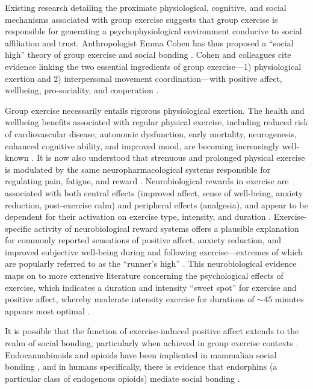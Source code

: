 \begin{CJK}{UTF8}{gbsn}
Existing research detailing the proximate physiological, cognitive, and social mechanisms associated with group exercise suggests that group exercise is responsible for generating a psychophysiological environment conducive to social affiliation and trust.  Anthropologist Emma Cohen has thus proposed a ``social high'' theory of group exercise and social bonding \citep[][hereafter ``the social high theory'', see]{Cohen2017}.  Cohen and colleagues cite evidence linking the two essential ingredients of group exercise---1) physiological exertion and 2) interpersonal movement coordination---with positive affect, wellbeing, pro-sociality, and cooperation \citep{Davis2015}.

Group exercise necessarily entails rigorous physiological exertion.
The health and wellbeing benefits associated with regular physical exercise, including reduced risk of cardiovascular disease, autonomic dysfunction, early mortality, neurogenesis, enhanced cognitive ability, and improved mood, are becoming increasingly well-known \citep{Blair1994,Nagamatsu2014}. It is now also understood that strenuous and prolonged physical exercise is modulated by the same neuropharmacological systems responsible for regulating pain, fatigue, and reward \citep{Boecker2008,Raichlen2013}.  Neurobiological rewards in exercise are associated with both central effects (improved affect, sense of well-being, anxiety reduction, post-exercise calm) and peripheral effects (analgesia), and appear to be dependent for their activation on exercise type, intensity, and duration \citep{Dietrich2004}.  Exercise-specific activity of neurobiological reward systems offers a plausible explanation for commonly reported sensations of positive affect, anxiety reduction, and improved subjective well-being during and following exercise---extremes of which are popularly referred to as the ``runner's high'' \citep{(Dietrich2004,Boecker2008,Raichlen2012}.  This neurobiological evidence maps on to more extensive literature concerning the psychological effects of exercise, which indicates a duration and intensity ``sweet spot'' for exercise and positive affect, whereby moderate intensity exercise for durations of $\sim45$ minutes appears most optimal \citep{Reed2006}.

It is possible that the function of exercise-induced positive affect extends to the realm of social bonding, particularly when achieved in group exercise contexts \citep{Cohen2009,Machin2011}.  Endocannabinoids and opioids have been implicated in mammalian social bonding \citep{Fattore2010,Keverne1989}, and in humans specifically, there is evidence that endorphins (a particular class of endogenous opioids) mediate social bonding \citep{Dunbar2012,Shultz2010}.


\end{CJK}
